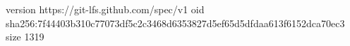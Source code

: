 version https://git-lfs.github.com/spec/v1
oid sha256:7f44403b310c77073df5c2c3468d6353827d5ef65d5dfdaa613f6152dca70ec3
size 1319
